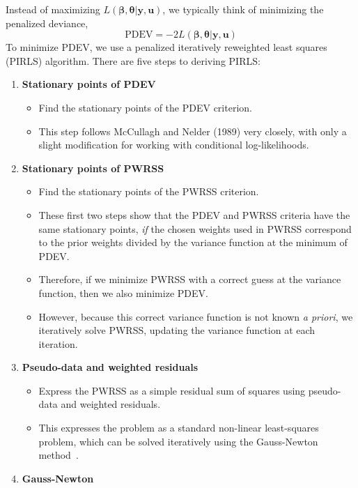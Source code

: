 \documentclass{jss}
\begin{document}
Instead of maximizing $L(\bm\beta, \bm\theta | \bm y, \bm u)$, we
typically think of minimizing the penalized
deviance,
\begin{equation}
\mathrm{PDEV} = -2 L(\bm\beta, \bm\theta | \bm y, \bm u)
\end{equation}
To minimize PDEV, we use a penalized iteratively reweighted least
squares (PIRLS) algorithm. There are five steps to deriving PIRLS: 
\begin{enumerate}
\item \textbf{Stationary points of PDEV}
  \begin{itemize}
    \item Find the stationary points of the PDEV criterion.
    \item This step follows McCullagh and Nelder (1989) very closely,
      with only a slight modification for working with conditional
      log-likelihoods.
  \end{itemize}
\item \textbf{Stationary points of PWRSS}
  \begin{itemize}
    \item Find the stationary points of the PWRSS criterion.
    \item These first two steps show that the PDEV and PWRSS criteria
      have the same stationary points, \emph{if} the chosen weights
      used in PWRSS correspond to the prior weights divided by the
      variance function at the minimum of PDEV.
    \item Therefore, if we minimize PWRSS with a correct guess at
      the variance function, then we also minimize PDEV.
    \item However, because this correct variance function is not known \emph{a priori},
      we iteratively solve PWRSS, updating the variance
      function at each iteration.
  \end{itemize}
\item \textbf{Pseudo-data and weighted residuals}
  \begin{itemize}
    \item Express the PWRSS as a simple residual sum of squares using
      pseudo-data and weighted residuals.
    \item This expresses the problem as a standard non-linear least-squares
      problem, which can be solved iteratively using the Gauss-Newton
      method~\citep[\S2.2.3]{bateswatts88:_nonlin}.
  \end{itemize}
\item \textbf{Gauss-Newton}

\end{enumerate}
\end{document}
